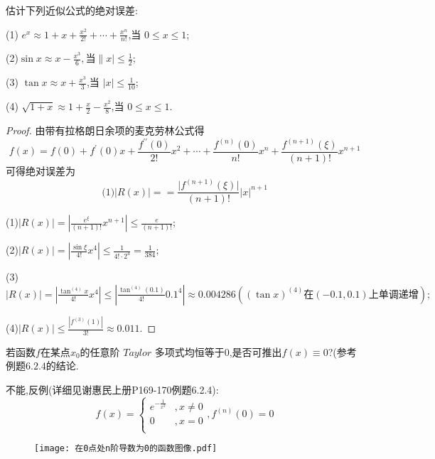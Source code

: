 \documentclass[lang=cn,newtx,10pt,scheme=chinese]{elegantbook}
\begin{document}
\begin{exercise}
估计下列近似公式的绝对误差:

(1) \(e^{x}\approx1 + x+\frac{x^{2}}{2!}+\cdots+\frac{x^{n}}{n!}\),当 \(0\leq x\leq1\);

(2)$\sin x\approx x-\frac{x^3}{6},当\|x|\le\frac{1}{2}$;

(3) \(\tan x\approx x+\frac{x^{3}}{3}\),当 \(\vert x\vert\leq\frac{1}{10}\);

(4) \(\sqrt{1 + x}\approx1+\frac{x}{2}-\frac{x^{2}}{8}\),当 \(0\leq x\leq1\).
\begin{proof}
    由带有拉格朗日余项的麦克劳林公式得
    \begin{equation}
    f(x)=f(0)+f^{\prime}(0)x+\frac{f^{\prime\prime}(0)}{2!}x^{2}+\cdots+\frac{f^{(n)}(0)}{n!}x^{n}+\frac{f^{(n + 1)}(\xi)}{(n + 1)!}x^{n + 1}
    \nonumber
    \end{equation}
    可得绝对误差为
    \begin{equation}
        \mathbf{(}1)|R\left( x \right) |==\frac{\vert f^{(n + 1)}(\xi)\vert}{(n + 1)!}\vert x\vert^{n + 1}
        \nonumber
    \end{equation}

        (1)$|R\left( x \right) |=\left| \frac{e^{\xi}}{\left( n+1 \right) !}x^{n+1} \right|\le \frac{e}{\left( n+1 \right) !};$
        
        (2)$|R\left( x \right) |=\left| \frac{\sin \xi}{4!}x^4 \right|\le \frac{1}{4!\cdot 2^4}=\frac{1}{384};$

        (3)$|R\left( x \right) |=\left| \frac{\tan ^{\left( 4 \right)}x}{4!}x^4 \right|\le \left| \frac{\tan ^{\left( 4 \right)}\left( 0.1 \right)}{4!}0.1^4 \right|\approx 0.004286 \left( \left( \tan x \right) ^{\left( 4 \right)}\text{在}\left( -0.1,0.1 \right) \text{上单调递增} \right) ;$
        
        (4)$|R\left( x \right) |\le \frac{\left| f^{\left( 3 \right)}\left( 1 \right) \right|}{3!}\approx 0.011.$
\end{proof}
\end{exercise}

\begin{exercise}
    若函数\(f\)在某点\(x_0\)的任意阶 $Taylor$ 多项式均恒等于\(0\),是否可推出\(f(x)\equiv0\)?(参考例题\(6.2.4\)的结论.
    \begin{solution}
        不能,反例(详细见谢惠民上册P169-170例题6.2.4):
        \begin{equation}
            f\left( x \right) =\begin{cases}
            e^{-\frac{1}{x^2}}&,x\ne 0\\
            0&,x=0\\
        \end{cases}
        ,f^{(n)}(0)=0
        \nonumber
        \end{equation}
        \begin{figure}[htbp]
            \centering
            \texttt{[image: 在0点处n阶导数为0的函数图像.pdf]}
        \end{figure}            
    \end{solution}
\end{exercise}
\end{document}
